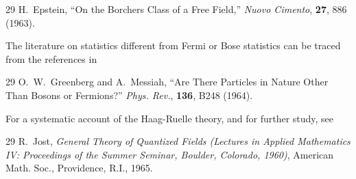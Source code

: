 \begin{thebibliography}{29}
\setcounter{NAT@ctr}{26}
 H.~Epstein, ``On the Borchers Class of a Free Field,''
\emph{Nuovo Cimento}, \textbf{27}, 886 (1963).
\end{thebibliography}

The literature on statistics different from Fermi or Bose statistics can be
traced from the references in

\begin{thebibliography}{29}
\setcounter{NAT@ctr}{27}
 O.~W.~Greenberg and A.~Messiah, ``Are There Particles in Nature
Other Than Bosons or Fermions?'' \emph{Phys. Rev.}, \textbf{136}, B248 (1964).
\end{thebibliography}

For a systematic account of the Haag-Ruelle theory, and for further study,
see

\begin{thebibliography}{29}
\setcounter{NAT@ctr}{28}
 R.~Jost, \emph{General Theory of Quantized Fields (Lectures in
Applied Mathematics IV: Proceedings of the Summer Seminar, Boulder, Colorado,
1960)}, American Math. Soc., Providence, R.I., 1965.
\end{thebibliography}
\endgroup
